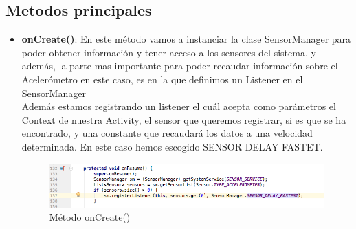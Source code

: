 \documentclass[12pt, a4paper, titlepage]{article}
\begin{document}
	\subsection{Metodos principales}
	\begin{itemize}
		\item \textbf{onCreate()}: En este método vamos a instanciar la clase SensorManager para poder obtener información y tener acceso a los sensores del sistema, y además, la parte mas importante para poder recaudar información sobre el Acelerómetro en este caso, es en la que definimos un Listener en el SensorManager\newline\\
		Además estamos registrando un listener el cuál acepta como parámetros el Context de nuestra Activity, el sensor que queremos registrar, si es que se ha encontrado, y una constante que recaudará los datos a una velocidad determinada. En este caso hemos escogido SENSOR DELAY FASTET.
		\begin{figure}[h!]
			\begin{center}
				\includegraphics[scale=0.55]{img/onCreate.png}
				\caption{Método onCreate()}
			\end{center}
		\end{figure}\\


\end{itemize}
\end{document}
